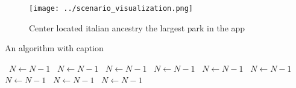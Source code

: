 \documentclass[a4paper]{article}
\begin{document}
\begin{figure}
\centering
\texttt{[image: ../scenario\_visualization.png]}
\caption{Center located italian ancestry the largest park in the app
}
\end{figure}
 
\begin{algorithm}
\caption{An algorithm with caption}
\begin{algorithmic}
\    \State $N \gets N - 1$
\    \State $N \gets N - 1$
\    \State $N \gets N - 1$
\    \State $N \gets N - 1$
\    \State $N \gets N - 1$
\    \State $N \gets N - 1$
\    \State $N \gets N - 1$
\    \State $N \gets N - 1$
\    \State $N \gets N - 1$
\EndWhile
\end{algorithmic}
\end{algorithm}
\end{document}
